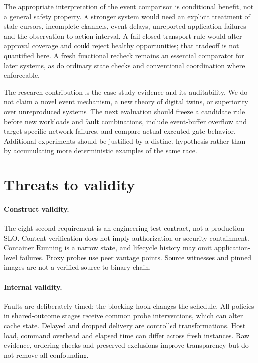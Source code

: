 \documentclass[11pt]{article}
\begin{document}
The appropriate interpretation of the event comparison is conditional benefit, not a general safety property. A stronger system would need an explicit treatment of stale cursors, incomplete channels, event delays, unreported application failures and the observation-to-action interval. A fail-closed transport rule would alter approval coverage and could reject healthy opportunities; that tradeoff is not quantified here. A fresh functional recheck remains an essential comparator for later systems, as do ordinary state checks and conventional coordination where enforceable.

The research contribution is the case-study evidence and its auditability. We do not claim a novel event mechanism, a new theory of digital twins, or superiority over unreproduced systems. The next evaluation should freeze a candidate rule before new workloads and fault combinations, include event-buffer overflow and target-specific network failures, and compare actual executed-gate behavior. Additional experiments should be justified by a distinct hypothesis rather than by accumulating more deterministic examples of the same race.

\section{Threats to validity}
\paragraph{Construct validity.} The eight-second requirement is an engineering test contract, not a production SLO. Content verification does not imply authorization or security containment. Container Running is a narrow state, and lifecycle history may omit application-level failures. Proxy probes use peer vantage points. Source witnesses and pinned images are not a verified source-to-binary chain.

\paragraph{Internal validity.} Faults are deliberately timed; the blocking hook changes the schedule. All policies in shared-outcome stages receive common probe interventions, which can alter cache state. Delayed and dropped delivery are controlled transformations. Host load, command overhead and elapsed time can differ across fresh instances. Raw evidence, ordering checks and preserved exclusions improve transparency but do not remove all confounding.
\end{document}
